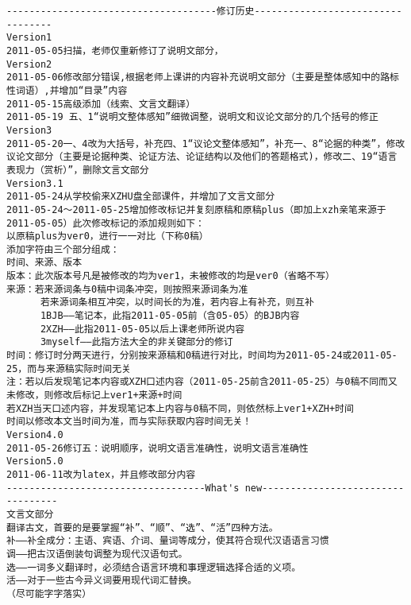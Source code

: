 \begin{verbatim}
-------------------------------------修订历史----------------------------------
Version1
2011-05-05扫描，老师仅重新修订了说明文部分，
Version2
2011-05-06修改部分错误,根据老师上课讲的内容补充说明文部分（主要是整体感知中的路标性词语）,并增加“目录”内容
2011-05-15高级添加（线索、文言文翻译）
2011-05-19 五、1“说明文整体感知”细微调整，说明文和议论文部分的几个括号的修正
Version3
2011-05-20一、4改为大括号，补充四、1“议论文整体感知”，补充一、8“论据的种类”，修改议论文部分（主要是论据种类、论证方法、论证结构以及他们的答题格式)，修改二、19“语言表现力（赏析）”，删除文言文部分
Version3.1
2011-05-24从学校偷来XZHU盘全部课件，并增加了文言文部分
2011-05-24～2011-05-25增加修改标记并复刻原稿和原稿plus（即加上xzh亲笔来源于2011-05-05）此次修改标记的添加规则如下：
以原稿plus为ver0，进行一一对比（下称0稿）
添加字符由三个部分组成：
时间、来源、版本
版本：此次版本号凡是被修改的均为ver1，未被修改的均是ver0（省略不写）
来源：若来源词条与0稿中词条冲突，则按照来源词条为准
      若来源词条相互冲突，以时间长的为准，若内容上有补充，则互补
      1BJB——笔记本，此指2011-05-05前（含05-05）的BJB内容
      2XZH——此指2011-05-05以后上课老师所说内容
      3myself——此指方法大全的非关键部分的修订
时间：修订时分两天进行，分别按来源稿和0稿进行对比，时间均为2011-05-24或2011-05-25，而与来源稿实际时间无关
注：若以后发现笔记本内容或XZH口述内容（2011-05-25前含2011-05-25）与0稿不同而又未修改，则修改后标记上ver1+来源+时间
若XZH当天口述内容，并发现笔记本上内容与0稿不同，则依然标上ver1+XZH+时间
时间以修改本文当时间为准，而与实际获取内容时间无关！
Version4.0
2011-05-26修订五：说明顺序，说明文语言准确性，说明文语言准确性
Version5.0
2011-06-11改为latex，并且修改部分内容
-----------------------------------What's new----------------------------------
文言文部分
翻译古文，首要的是要掌握“补”、“顺”、“选”、“活”四种方法。
补——补全成分：主语、宾语、介词、量词等成分，使其符合现代汉语语言习惯
调——把古汉语倒装句调整为现代汉语句式。
选——一词多义翻译时，必须结合语言环境和事理逻辑选择合适的义项。
活——对于一些古今异义词要用现代词汇替换。
（尽可能字字落实）
\end{verbatim}
\newpage
